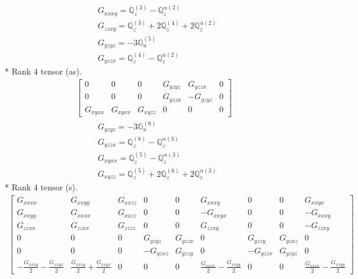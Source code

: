 \documentclass[fleqn,8pt,landscape]{jsarticle}
\begin{document}
\begin{align*}
& G_{xxxy} = \mathbb{Q}_{z}^{(3)} - \mathbb{Q}_{z}^{\alpha(2)} \\
& G_{zzxy} = \mathbb{Q}_{z}^{(3)} + 2 \mathbb{Q}_{z}^{(4)} + 2 \mathbb{Q}_{z}^{\alpha(2)} \\
& G_{yzyz} = - 3 \mathbb{G}_{u}^{(5)} \\
& G_{yzzx} = \mathbb{Q}_{z}^{(4)} - \mathbb{Q}_{z}^{\alpha(2)}
\end{align*}
* Rank 4 tensor (as).
\begin{align*}
\begin{bmatrix} 0 & 0 & 0 & G_{yzyz} & G_{yzzx} & 0 \\ 0 & 0 & 0 & G_{yzzx} & - G_{yzyz} & 0 \\ G_{xyxx} & G_{xyxx} & G_{xyzz} & 0 & 0 & 0 \end{bmatrix}
\end{align*}
\begin{align*}
& G_{yzyz} = - 3 \mathbb{G}_{u}^{(6)} \\
& G_{yzzx} = \mathbb{Q}_{z}^{(6)} - \mathbb{Q}_{z}^{\alpha(3)} \\
& G_{xyxx} = \mathbb{Q}_{z}^{(5)} - \mathbb{Q}_{z}^{\alpha(3)} \\
& G_{xyzz} = \mathbb{Q}_{z}^{(5)} + 2 \mathbb{Q}_{z}^{(6)} + 2 \mathbb{Q}_{z}^{\alpha(3)}
\end{align*}
* Rank 4 tensor (s).
\begin{align*}
\begin{bmatrix} G_{xxxx} & G_{xxyy} & G_{xxzz} & 0 & 0 & G_{xxxy} & 0 & 0 & G_{xxyx} \\ G_{xxyy} & G_{xxxx} & G_{xxzz} & 0 & 0 & - G_{xxyx} & 0 & 0 & - G_{xxxy} \\ G_{zzxx} & G_{zzxx} & G_{zzzz} & 0 & 0 & G_{zzxy} & 0 & 0 & - G_{zzxy} \\ 0 & 0 & 0 & G_{yzyz} & G_{yzzx} & 0 & G_{yzzy} & G_{yzxz} & 0 \\ 0 & 0 & 0 & - G_{yzxz} & G_{yzzy} & 0 & - G_{yzzx} & G_{yzyz} & 0 \\ - \frac{G_{xxxy}}{2} - \frac{G_{xxyx}}{2} & \frac{G_{xxxy}}{2} + \frac{G_{xxyx}}{2} & 0 & 0 & 0 & \frac{G_{xxxx}}{2} - \frac{G_{xxyy}}{2} & 0 & 0 & \frac{G_{xxxx}}{2} - \frac{G_{xxyy}}{2} \end{bmatrix}
\end{align*}
\end{document}
